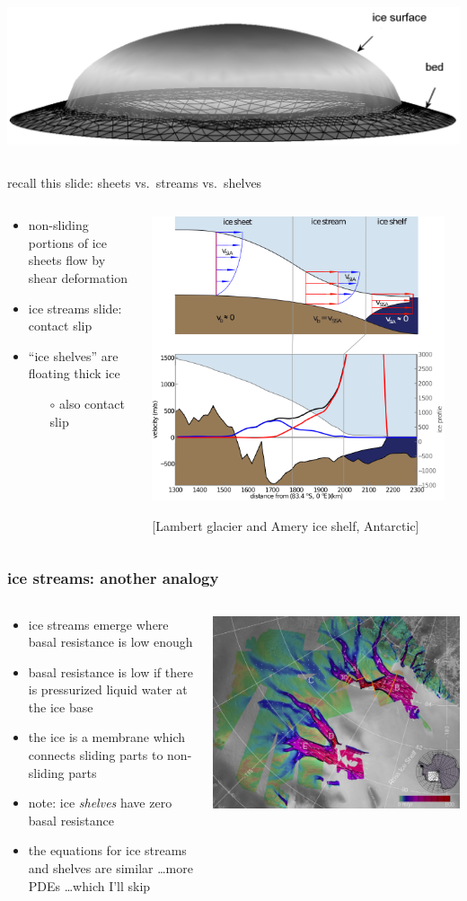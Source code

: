\documentclass[10pt,hyperref={pdfpagelabels=true}]{beamer}
\newcommand{\contactslipslide}[1]{
\begin{frame}{#1 sheets vs.~streams vs.~shelves}

\begin{columns}
\begin{column}{0.35\textwidth}
\small
\begin{itemize}
\small
\item non-sliding portions of ice sheets flow by shear deformation
\item ice streams slide: \alert{contact slip}
\item ``ice shelves'' are floating thick ice
  \begin{itemize}
  \scriptsize
  \item[$\circ$] also \alert{contact slip}
  \end{itemize}
\end{itemize}
\end{column}

\begin{column}{0.65\textwidth}

\hfill\includegraphics[width=0.95\textwidth]{siassacartoon-lambert}

\begin{center}
\vspace{-0.18in}
\tiny [Lambert glacier and Amery ice shelf, Antarctic]
\end{center}
\end{column}
\end{columns}
\end{frame}
}
\begin{document}
\begin{frame}
\begin{columns}
\begin{column}{0.65\textwidth}
\begin{center}
\includegraphics[width=\textwidth]{capnonflatobs}
\end{center}
\end{column}
\end{columns}
\end{frame}



\contactslipslide{recall this slide:}


\begin{frame}
  \frametitle{ice streams: another analogy}

\begin{columns}
\begin{column}{0.6\textwidth}
\begin{itemize}
\item ice streams emerge where basal resistance is low enough
\item basal resistance is low if there is pressurized liquid water at the ice base
\item the ice is a membrane which connects sliding parts to non-sliding parts

\bigskip
\item<2> note: ice \emph{shelves} have zero basal resistance
\item<2> the equations for ice streams and shelves are similar \dots more PDEs \dots which I'll skip
\end{itemize}
\end{column}
\begin{column}{0.4\textwidth}
\includegraphics[width=\textwidth]{siple}


\end{column}
\end{columns}
\end{frame}
\end{document}
